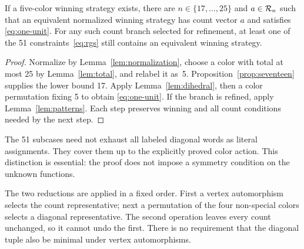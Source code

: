 \begin{proposition}\label{prop:coverage}
If a five-color winning strategy exists, there are
$n\in\{17,\ldots,25\}$ and $a\in\mathcal{R}_n$ such that an equivalent
normalized winning strategy has count vector $a$ and satisfies
\eqref{eq:one-unit}. For any such count branch selected for refinement,
at least one of the 51 constraints~\eqref{eq:rgs} still contains an
equivalent winning strategy.
\end{proposition}
\begin{proof}
Normalize by Lemma~\ref{lem:normalization}, choose a color with total at
most 25 by Lemma~\ref{lem:total}, and relabel it as~5.
Proposition~\ref{prop:seventeen} supplies the lower bound 17. Apply
Lemma~\ref{lem:dihedral}, then a color permutation fixing 5 to obtain
\eqref{eq:one-unit}. If the branch is refined, apply
Lemma~\ref{lem:patterns}. Each step preserves winning and all count
conditions needed by the next step.
\end{proof}

The 51 subcases need not exhaust all labeled diagonal words as literal
assignments. They cover them up to the explicitly proved color action.
This distinction is essential: the proof does not impose a symmetry
condition on the unknown functions.

The two reductions are applied in a fixed order. First a vertex
 automorphism selects the count representative; next a permutation of
 the four non-special colors selects a diagonal representative. The
 second operation leaves every count unchanged, so it cannot undo the
 first. There is no requirement that the diagonal tuple also be minimal
 under vertex automorphisms.

